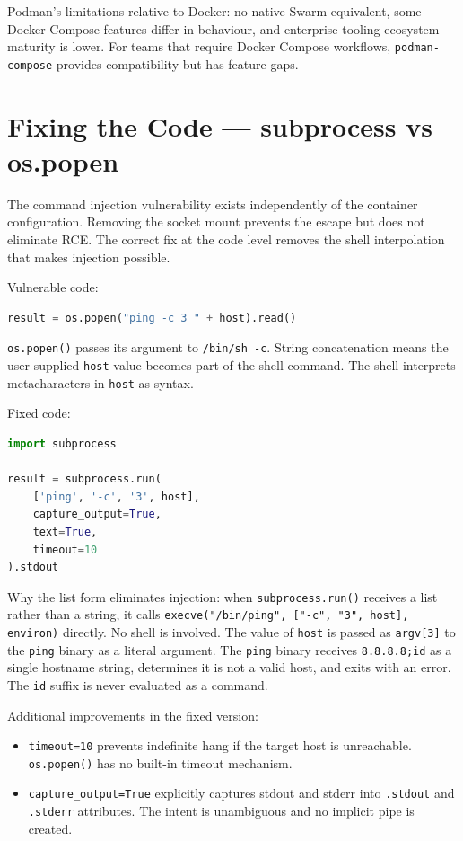 Podman's limitations relative to Docker: no native Swarm equivalent, some Docker Compose features differ in behaviour, and enterprise tooling ecosystem maturity is lower. For teams that require Docker Compose workflows, \texttt{podman-compose} provides compatibility but has feature gaps.


\section{Fixing the Code --- subprocess vs os.popen}

The command injection vulnerability exists independently of the container configuration. Removing the socket mount prevents the escape but does not eliminate RCE. The correct fix at the code level removes the shell interpolation that makes injection possible.

Vulnerable code:

\begin{lstlisting}[language=python]
result = os.popen("ping -c 3 " + host).read()
\end{lstlisting}

\texttt{os.popen()} passes its argument to \texttt{/bin/sh -c}. String concatenation means the user-supplied \texttt{host} value becomes part of the shell command. The shell interprets metacharacters in \texttt{host} as syntax.

Fixed code:

\begin{lstlisting}[language=python]
import subprocess

result = subprocess.run(
    ['ping', '-c', '3', host],
    capture_output=True,
    text=True,
    timeout=10
).stdout
\end{lstlisting}

Why the list form eliminates injection: when \texttt{subprocess.run()} receives a list rather than a string, it calls \texttt{execve("/bin/ping", ["-c", "3", host], environ)} directly. No shell is involved. The value of \texttt{host} is passed as \texttt{argv[3]} to the \texttt{ping} binary as a literal argument. The \texttt{ping} binary receives \texttt{8.8.8.8;id} as a single hostname string, determines it is not a valid host, and exits with an error. The \texttt{id} suffix is never evaluated as a command.

Additional improvements in the fixed version:
\begin{itemize}
    \item \texttt{timeout=10} prevents indefinite hang if the target host is unreachable. \texttt{os.popen()} has no built-in timeout mechanism.
    \item \texttt{capture\_output=True} explicitly captures stdout and stderr into \texttt{.stdout} and \texttt{.stderr} attributes. The intent is unambiguous and no implicit pipe is created.
\end{itemize}

